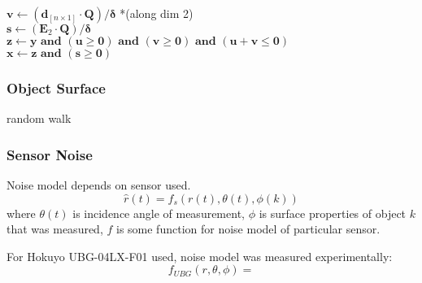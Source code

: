\begin{algorithm}
{		$\mathbf{v} \longleftarrow (\mathbf{d}_{[n \times 1]} \cdot \mathbf{Q})/\bm{\delta}$ *(along dim 2)\\
		$\mathbf{s} \longleftarrow (\mathbf{E}_2 \cdot \mathbf{Q})/\bm{\delta}$\\
		$\mathbf{z} \longleftarrow \mathbf{y} \textbf{ and } (\mathbf{u} \geq \mathbf{0}) 
		\textbf{ and } (\mathbf{v} \geq \mathbf{0}) \textbf{ and } (\mathbf{u}+\mathbf{v} \leq 
		\mathbf{0})$\\
		$\mathbf{x} \longleftarrow \mathbf{z} \textbf{ and } (\mathbf{s} \geq \mathbf{0})$\\
	}
	\caption{M{\"o}ller-Trumbore ray-triangle intersection \label{intersection}}
	\end{algorithm}
	
	\subsubsection{Object Surface}
	random walk
	
	\subsubsection{Sensor Noise}
	Noise model depends on sensor used.
	\begin{equation}
		\hat{r}(t) = f_s(r(t),\theta(t),\phi(k))
	\end{equation}
	where $\theta(t)$ is incidence angle of measurement, $\phi$ is surface properties of object $k$ that was measured, $f$ is some function for noise model of particular sensor.
	
	For Hokuyo UBG-04LX-F01 used, noise model was measured experimentally:
	\begin{equation}
		f_{UBG}(r,\theta,\phi) = 
	\end{equation}
	
